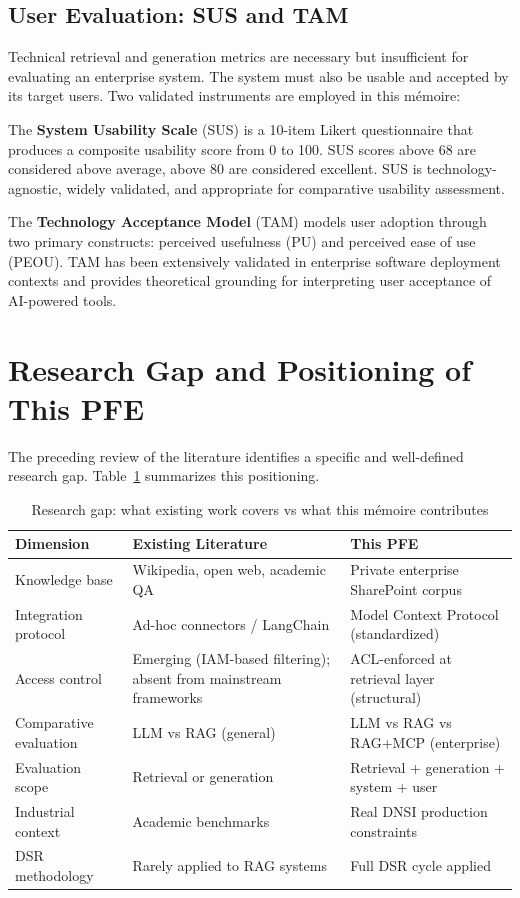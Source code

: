 \subsection{User Evaluation: SUS and TAM}

Technical retrieval and generation metrics are necessary but insufficient for evaluating an enterprise system. The system must also be usable and accepted by its target users. Two validated instruments are employed in this mémoire:

The \textbf{System Usability Scale} (SUS) \citep{Brooke1996SUS} is a 10-item Likert questionnaire that produces a composite usability score from 0 to 100. SUS scores above 68 are considered above average, above 80 are considered excellent. SUS is technology-agnostic, widely validated, and appropriate for comparative usability assessment.

The \textbf{Technology Acceptance Model} (TAM) \citep{Davis1989TAM} models user adoption through two primary constructs: perceived usefulness (PU) and perceived ease of use (PEOU). TAM has been extensively validated in enterprise software deployment contexts and provides theoretical grounding for interpreting user acceptance of AI-powered tools.

\section{Research Gap and Positioning of This PFE}
\label{sec:bg-gap}

The preceding review of the literature identifies a specific and well-defined research gap. Table~\ref{tab:research-gap} summarizes this positioning.

\begin{table}[H]
\centering
\caption{Research gap: what existing work covers vs what this mémoire contributes}
\label{tab:research-gap}
\begin{tabularx}{\textwidth}{@{}lXX@{}}
\toprule
\textbf{Dimension} & \textbf{Existing Literature} & \textbf{This PFE} \\
\midrule
Knowledge base & Wikipedia, open web, academic QA & Private enterprise SharePoint corpus \\
Integration protocol & Ad-hoc connectors / LangChain & Model Context Protocol (standardized) \\
Access control & Emerging (IAM-based filtering); absent from mainstream frameworks & ACL-enforced at retrieval layer (structural) \\
Comparative evaluation & LLM vs RAG (general) & LLM vs RAG vs RAG+MCP (enterprise) \\
Evaluation scope & Retrieval or generation & Retrieval + generation + system + user \\
Industrial context & Academic benchmarks & Real DNSI production constraints \\
DSR methodology & Rarely applied to RAG systems & Full DSR cycle applied \\
\bottomrule
\end{tabularx}
\end{table}

